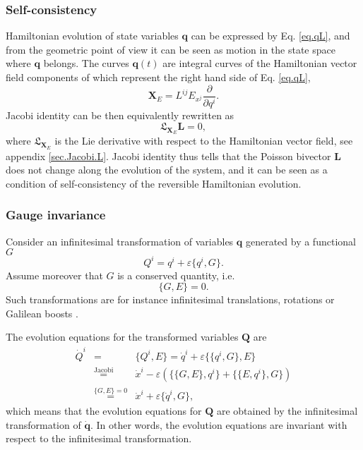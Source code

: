 \documentclass[
10pt, %
a4paper, %
oneside, %
headinclude,footinclude, %
BCOR5mm, %
]{scrartcl}
\newcommand{\XX}{\mathbf{X}}
\newcommand{\eps}{\varepsilon}
\newcommand{\qq}{\mathbf{q}}
\newcommand{\QQ}{\mathbf{Q}}
\newcommand{\LL}{\mathbf{L}}
\newcommand{\Lie}{\mathfrak{L}}
\begin{document}
\subsubsection{Self-consistency}
Hamiltonian evolution of state variables $\qq$ can be expressed by Eq. \eqref{eq.qL}, and from the geometric point of view it can be seen as motion in the state space where $\qq$ belongs. The curves $\qq(t)$ are integral curves of the Hamiltonian vector field components of which represent the right hand side of Eq. \eqref{eq.qL}, 
\begin{equation}
	\XX_E = L^{ij}E_{x^j} \frac{\partial}{\partial q^i}.
\end{equation}
Jacobi identity can be then equivalently rewritten as
\begin{equation}
	\Lie_{\XX_E}\LL = 0,
\end{equation}
where $\Lie_{\XX_E}$ is the Lie derivative with respect to the Hamiltonian vector field, see appendix \ref{sec.Jacobi.L}. Jacobi identity thus tells that the Poisson bivector $\LL$ does not change along the evolution of the system, and it can be seen as a condition of self-consistency of the reversible Hamiltonian evolution.

\subsubsection{Gauge invariance}
Consider an infinitesimal transformation of variables $\qq$ generated by a functional $G$ 
\begin{equation}
	Q^i = q^i + \eps \{q^i, G\}.
\end{equation}
Assume moreover that $G$ is a conserved quantity, i.e.
\begin{equation}
	\{G,E\} = 0.
\end{equation}
Such transformations are for instance infinitesimal translations, rotations or Galilean boosts \cite{PKG}.

The evolution equations for the transformed variables $\QQ$ are
\begin{eqnarray}
	\dot{Q}^i &=& \{Q^i, E\} = \dot{q}^i + \eps\{\{q^i, G\}, E\}\nonumber\\
	&\stackrel{\mathrm{Jacobi}}{=}& \dot{x}^i - \eps\left(\{\{G, E\}, q^i\}+\{\{E, q^i\}, G\}\right)\nonumber\\
	&\stackrel{\{G,E\}=0}{=}&\dot{x}^i + \eps\{\dot{q}^i, G\},
\end{eqnarray}
which means that the evolution equations for $\QQ$ are obtained by the infinitesimal transformation of $\dot{\qq}$. In other words, the evolution equations are invariant with respect to the infinitesimal transformation. 
\end{document}
